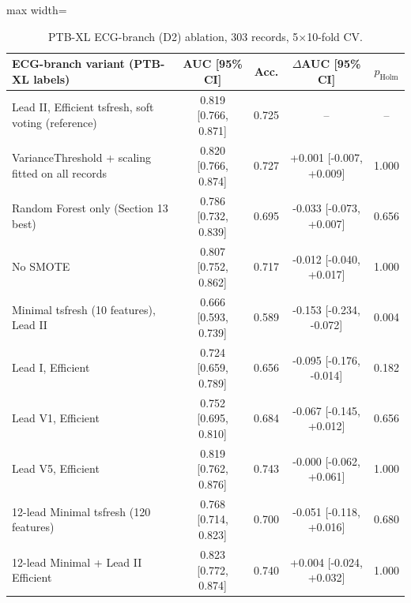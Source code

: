 \begin{table}[!t]
\centering
\scriptsize
\caption{PTB-XL ECG-branch (D2) ablation, 303 records, 5$\times$10-fold CV.}
\label{tab:e10}
\setlength{\tabcolsep}{3pt}
\begin{adjustbox}{max width=\linewidth}
\begin{tabular}{lcccc}
\toprule
ECG-branch variant (PTB-XL labels) & AUC [95\% CI] & Acc. & $\Delta$AUC [95\% CI] & $p_{\mathrm{Holm}}$ \\
\midrule
Lead II, Efficient tsfresh, soft voting (reference) & 0.819 [0.766, 0.871] & 0.725 & -- & -- \\
VarianceThreshold + scaling fitted on all records & 0.820 [0.766, 0.874] & 0.727 & +0.001 [-0.007, +0.009] & 1.000 \\
Random Forest only (Section 13 best) & 0.786 [0.732, 0.839] & 0.695 & -0.033 [-0.073, +0.007] & 0.656 \\
No SMOTE & 0.807 [0.752, 0.862] & 0.717 & -0.012 [-0.040, +0.017] & 1.000 \\
Minimal tsfresh (10 features), Lead II & 0.666 [0.593, 0.739] & 0.589 & -0.153 [-0.234, -0.072] & 0.004 \\
Lead I, Efficient & 0.724 [0.659, 0.789] & 0.656 & -0.095 [-0.176, -0.014] & 0.182 \\
Lead V1, Efficient & 0.752 [0.695, 0.810] & 0.684 & -0.067 [-0.145, +0.012] & 0.656 \\
Lead V5, Efficient & 0.819 [0.762, 0.876] & 0.743 & -0.000 [-0.062, +0.061] & 1.000 \\
12-lead Minimal tsfresh (120 features) & 0.768 [0.714, 0.823] & 0.700 & -0.051 [-0.118, +0.016] & 0.680 \\
12-lead Minimal + Lead II Efficient & 0.823 [0.772, 0.874] & 0.740 & +0.004 [-0.024, +0.032] & 1.000 \\
\bottomrule
\end{tabular}
\end{adjustbox}
\end{table}
